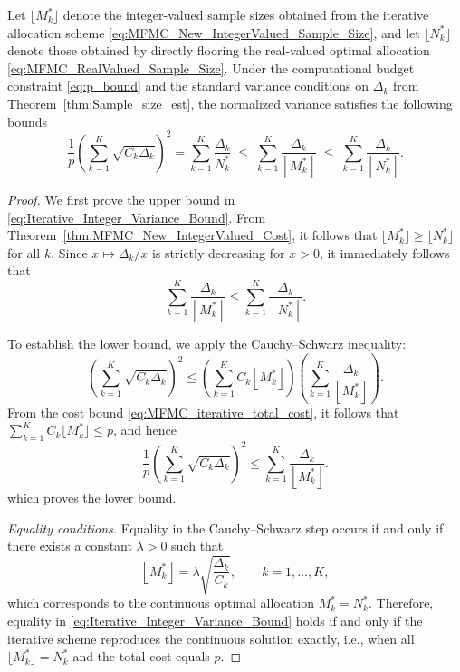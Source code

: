 %
\begin{theorem}
\label{thm:MFMC_New_IntegerValued_Variance}
Let $\lfloor M_k^* \rfloor$ denote the integer-valued sample sizes obtained from the iterative allocation scheme \eqref{eq:MFMC_New_IntegerValued_Sample_Size}, and let $\lfloor N_k^* \rfloor$ denote those obtained by directly flooring the real-valued optimal allocation \eqref{eq:MFMC_RealValued_Sample_Size}. Under the computational budget constraint \eqref{eq:p_bound} and the standard variance conditions on $\Delta_k$ from Theorem~\ref{thm:Sample_size_est}, the normalized variance satisfies the following bounds
%
\begin{equation}\label{eq:Iterative_Integer_Variance_Bound}
\frac{1}{p}\left(\sum_{k=1}^K \sqrt{C_k \Delta_k}\right)^2
= \sum_{k=1}^K \frac{\Delta_k}{N_k^*}
\;\le\;
\sum_{k=1}^K \frac{\Delta_k}{\left\lfloor M_k^* \right\rfloor}
\;\le\;
\sum_{k=1}^K \frac{\Delta_k}{\left\lfloor N_k^* \right\rfloor}.
\end{equation}
%
\end{theorem}
%




\begin{proof}
We first prove the upper bound in \eqref{eq:Iterative_Integer_Variance_Bound}.  
From Theorem~\ref{thm:MFMC_New_IntegerValued_Cost}, it follows that $\lfloor M_k^* \rfloor \ge \lfloor N_k^* \rfloor$ for all $k$.  
Since $x \mapsto \Delta_k/x$ is strictly decreasing for $x > 0$, it immediately follows that
\[
\sum_{k=1}^K \frac{\Delta_k}{\left\lfloor M_k^* \right\rfloor} 
\le \sum_{k=1}^K \frac{\Delta_k}{\left\lfloor N_k^* \right\rfloor}.
\]

\medskip
\noindent
To establish the lower bound, we apply the Cauchy--Schwarz inequality:
%
\[
\left(\sum_{k=1}^K \sqrt{C_k \Delta_k}\right)^2
\le
\left(\sum_{k=1}^K C_k \left\lfloor M_k^* \right\rfloor\right)
\left(\sum_{k=1}^K \frac{\Delta_k}{\left\lfloor M_k^* \right\rfloor}\right).
\]
%
From the cost bound \eqref{eq:MFMC_iterative_total_cost}, it follows that 
$\sum_{k=1}^K C_k \lfloor M_k^* \rfloor \le p$, and hence
%
\[
\frac{1}{p}\left(\sum_{k=1}^K \sqrt{C_k \Delta_k}\right)^2
\le
\sum_{k=1}^K \frac{\Delta_k}{\left\lfloor M_k^* \right\rfloor}.
\]
%
which proves the lower bound.

\medskip
\noindent
\textit{Equality conditions.} 
Equality in the Cauchy--Schwarz step occurs if and only if there exists a constant $\lambda>0$ such that
\[
\left\lfloor M_k^* \right\rfloor = \lambda \sqrt{\frac{\Delta_k}{C_k}}, \qquad k=1,\ldots,K,
\]
which corresponds to the continuous optimal allocation $M_k^* = N_k^*$. Therefore, equality in \eqref{eq:Iterative_Integer_Variance_Bound} holds if and only if the iterative scheme reproduces the continuous solution exactly, i.e., when all $\lfloor M_k^* \rfloor = N_k^*$ and the total cost equals $p$.
\end{proof}




